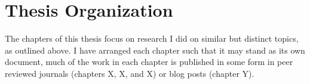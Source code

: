 \section{Thesis Organization}
The chapters of this thesis focus on research I did on similar but distinct topics, as outlined above. I have arranged each chapter such that it may stand as its own document, much of the work in each chapter is published in some form in peer reviewed journals (chapters X, X, and X) or blog posts (chapter Y). 

